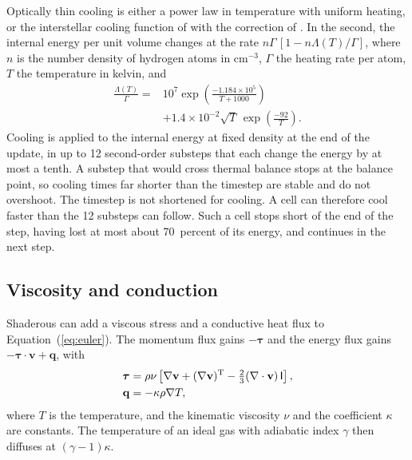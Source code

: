 \documentclass[twocolumn]{aastex701}
\begin{document}
Optically thin cooling is either a power law in temperature with uniform heating, or the interstellar cooling function of \citet{Koyama2002} with the correction of \citet{VazquezSemadeni2007}. In the second, the internal energy per unit volume changes at the rate $n\Gamma\,[1 - n\Lambda(T)/\Gamma]$, where $n$ is the number density of hydrogen atoms in cm$^{-3}$, $\Gamma$ the heating rate per atom, $T$ the temperature in kelvin, and
\begin{equation*}
\begin{aligned}
\frac{\Lambda(T)}{\Gamma} ={}& 10^{7}\exp\left(\frac{-1.184\times10^{5}}{T + 1000}\right)\\
&+ 1.4\times10^{-2}\sqrt{T}\,\exp\left(\frac{-92}{T}\right).
\end{aligned}
\end{equation*}
Cooling is applied to the internal energy at fixed density at the end of the update, in up to 12 second-order substeps that each change the energy by at most a tenth. A substep that would cross thermal balance stops at the balance point, so cooling times far shorter than the timestep are stable and do not overshoot. The timestep is not shortened for cooling. A cell can therefore cool faster than the 12 substeps can follow. Such a cell stops short of the end of the step, having lost at most about 70~percent of its energy, and continues in the next step.

\subsection{Viscosity and conduction}
\label{sec:diffusion}

Shaderous can add a viscous stress and a conductive heat flux to Equation~(\ref{eq:euler}). The momentum flux gains $-\boldsymbol{\tau}$ and the energy flux gains $-\boldsymbol{\tau}\cdot\mathbf{v} + \mathbf{q}$, with
\begin{equation}
\begin{aligned}
\boldsymbol{\tau} &= \rho\nu\left[\nabla\mathbf{v} + (\nabla\mathbf{v})^{\rm T} - \tfrac{2}{3}(\nabla\cdot\mathbf{v})\,\mathsf{I}\right],\\
\mathbf{q} &= -\kappa\rho\nabla T,
\end{aligned}
\label{eq:diffusion}
\end{equation}
where $T$ is the temperature, and the kinematic viscosity $\nu$ and the coefficient $\kappa$ are constants. The temperature of an ideal gas with adiabatic index $\gamma$ then diffuses at $(\gamma - 1)\kappa$.
\end{document}
